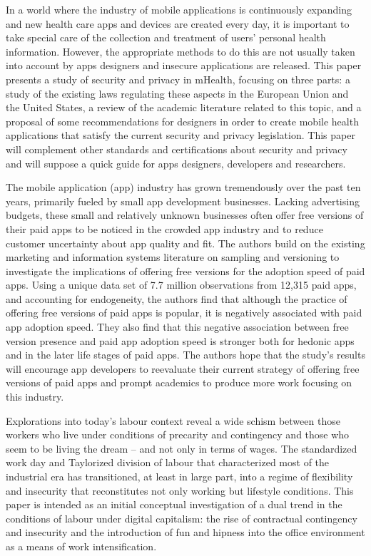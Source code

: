 \documentclass{article}
\begin{document}
\medskip

In a world where the industry of mobile applications is continuously expanding and new health care apps and devices are created every day, it is important to take special care of the collection and treatment of users’ personal health information. However, the appropriate methods to do this are not usually taken into account by apps designers and insecure applications are released. This paper presents a study of security and privacy in mHealth, focusing on three parts: a study of the existing laws regulating these aspects in the European Union and the United States, a review of the academic literature related to this topic, and a proposal of some recommendations for designers in order to create mobile health applications that satisfy the current security and privacy legislation. This paper will complement other standards and certifications about security and privacy and will suppose a quick guide for apps designers, developers and researchers. \cite{martinez2015privacy}

The mobile application (app) industry has grown tremendously over the past ten years, primarily fueled by small app development businesses. Lacking advertising budgets, these small and relatively unknown businesses often offer free versions of their paid apps to be noticed in the crowded app industry and to reduce customer uncertainty about app quality and fit. The authors build on the existing marketing and information systems literature on sampling and versioning to investigate the implications of offering free versions for the adoption speed of paid apps. Using a unique data set of 7.7 million observations from 12,315 paid apps, and accounting for endogeneity, the authors find that although the practice of offering free versions of paid apps is popular, it is negatively associated with paid app adoption speed. They also find that this negative association between free version presence and paid app adoption speed is stronger both for hedonic apps and in the later life stages of paid apps. The authors hope that the study's results will encourage app developers to reevaluate their current strategy of offering free versions of paid apps and prompt academics to produce more work focusing on this industry.\cite{arora2017implications}

\medskip

Explorations	into	today’s	labour	context	reveal	a	wide	schism	between	those	workers	who	live	under	
conditions	of	precarity and	contingency	and	those	who	seem	to	be	living	the	dream	– and	not	only	in	
terms	of	wages.	The	standardized	work	day	and	Taylorized	division	of	labour	that	characterized	most	
of	the	industrial	era	has	transitioned,	at	least	in	large	part,	into	a	regime	of	flexibility	and	insecurity	
that	reconstitutes	not	only	working	but	lifestyle	conditions.	This	paper	is	intended	as	an	initial	conceptual	investigation	of	a	dual	trend	in	the	conditions	of	labour	under	digital capitalism:	the	rise	of	
contractual	contingency	and	insecurity	and	the	introduction	of	fun	and	hipness	into	the	office	environment as	a	means	of	work	intensification. \cite{anderson2016contingency}
\end{document}
